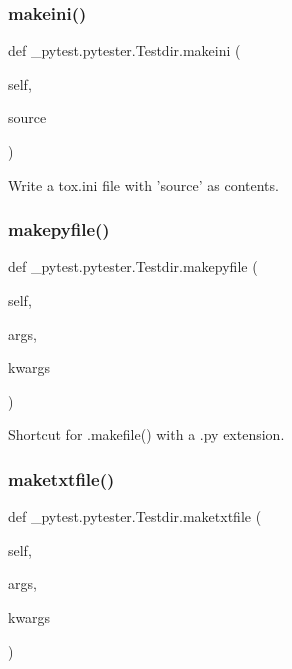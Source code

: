 \subsubsection{\texorpdfstring{makeini()}{makeini()}}
{\footnotesize\ttfamily def \+\_\+pytest.\+pytester.\+Testdir.\+makeini (\begin{DoxyParamCaption}\item[{}]{self,  }\item[{}]{source }\end{DoxyParamCaption})}

\begin{DoxyVerb}Write a tox.ini file with 'source' as contents.\end{DoxyVerb}
 \mbox{\label{class__pytest_1_1pytester_1_1_testdir_af71295b49819f3feb59496921e6e1261}} 
\subsubsection{\texorpdfstring{makepyfile()}{makepyfile()}}
{\footnotesize\ttfamily def \+\_\+pytest.\+pytester.\+Testdir.\+makepyfile (\begin{DoxyParamCaption}\item[{}]{self,  }\item[{}]{args,  }\item[{}]{kwargs }\end{DoxyParamCaption})}

\begin{DoxyVerb}Shortcut for .makefile() with a .py extension.\end{DoxyVerb}
 \mbox{\label{class__pytest_1_1pytester_1_1_testdir_af243dc840be0d233114a96752547a33b}} 
\subsubsection{\texorpdfstring{maketxtfile()}{maketxtfile()}}
{\footnotesize\ttfamily def \+\_\+pytest.\+pytester.\+Testdir.\+maketxtfile (\begin{DoxyParamCaption}\item[{}]{self,  }\item[{}]{args,  }\item[{}]{kwargs }\end{DoxyParamCaption})}

